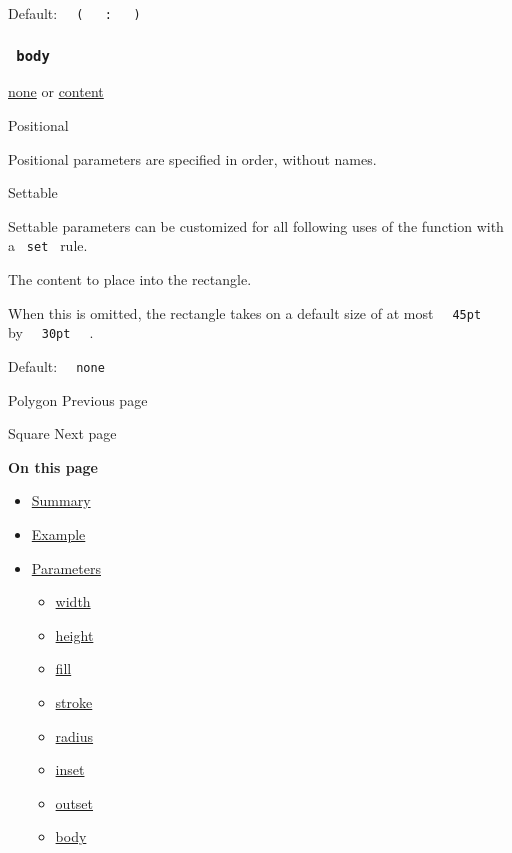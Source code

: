 Default:
\texttt{\ }{\texttt{\ (\ }}\texttt{\ }{\texttt{\ :\ }}\texttt{\ }{\texttt{\ )\ }}\texttt{\ }

\subsubsection{\texorpdfstring{\texttt{\ body\ }}{ body }}\label{parameters-body}

\href{/docs/reference/foundations/none/}{none} {or}
\href{/docs/reference/foundations/content/}{content}

{{ Positional }}

\label{parameters-body-positional-tooltip}
Positional parameters are specified in order, without names.

{{ Settable }}

\label{parameters-body-settable-tooltip}
Settable parameters can be customized for all following uses of the
function with a \texttt{\ set\ } rule.

The content to place into the rectangle.

When this is omitted, the rectangle takes on a default size of at most
\texttt{\ }{\texttt{\ 45pt\ }}\texttt{\ } by
\texttt{\ }{\texttt{\ 30pt\ }}\texttt{\ } .

Default: \texttt{\ }{\texttt{\ none\ }}\texttt{\ }

\href{/docs/reference/visualize/polygon/}{\pandocbounded{}}

{ Polygon } { Previous page }

\href{/docs/reference/visualize/square/}{\pandocbounded{}}

{ Square } { Next page }

\textbf{On this page}

\begin{itemize}
\tightlist
\item
  \hyperref[summary]{Summary}
\item
  \hyperref[example]{Example}
\item
  \hyperref[parameters]{Parameters}

  \begin{itemize}
  \tightlist
  \item
    \hyperref[parameters-width]{width}
  \item
    \hyperref[parameters-height]{height}
  \item
    \hyperref[parameters-fill]{fill}
  \item
    \hyperref[parameters-stroke]{stroke}
  \item
    \hyperref[parameters-radius]{radius}
  \item
    \hyperref[parameters-inset]{inset}
  \item
    \hyperref[parameters-outset]{outset}
  \item
    \hyperref[parameters-body]{body}
  \end{itemize}
\end{itemize}

